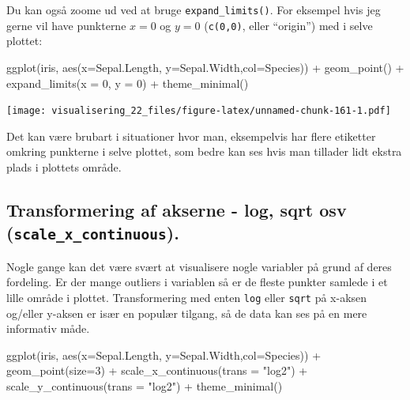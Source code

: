 \documentclass[
]{book}
\newenvironment{Shaded}{\begin{snugshade}}{\end{snugshade}}
\newcommand{\AttributeTok}[1]{\textcolor[rgb]{0.77,0.63,0.00}{#1}}
\newcommand{\DecValTok}[1]{\textcolor[rgb]{0.00,0.00,0.81}{#1}}
\newcommand{\FunctionTok}[1]{\textcolor[rgb]{0.00,0.00,0.00}{#1}}
\newcommand{\NormalTok}[1]{#1}
\newcommand{\SpecialCharTok}[1]{\textcolor[rgb]{0.00,0.00,0.00}{#1}}
\newcommand{\StringTok}[1]{\textcolor[rgb]{0.31,0.60,0.02}{#1}}
\begin{document}
Du kan også zoome ud ved at bruge \texttt{expand\_limits()}. For eksempel hvis jeg gerne vil have punkterne \(x = 0\) og \(y = 0\) (\texttt{c(0,0)}, eller ``origin'') med i selve plottet:

\begin{Shaded}
\begin{Highlighting}[]
\FunctionTok{ggplot}\NormalTok{(iris, }\FunctionTok{aes}\NormalTok{(}\AttributeTok{x=}\NormalTok{Sepal.Length, }\AttributeTok{y=}\NormalTok{Sepal.Width,}\AttributeTok{col=}\NormalTok{Species)) }\SpecialCharTok{+}
  \FunctionTok{geom\_point}\NormalTok{() }\SpecialCharTok{+} 
  \FunctionTok{expand\_limits}\NormalTok{(}\AttributeTok{x =} \DecValTok{0}\NormalTok{, }\AttributeTok{y =} \DecValTok{0}\NormalTok{) }\SpecialCharTok{+}
  \FunctionTok{theme\_minimal}\NormalTok{() }
\end{Highlighting}
\end{Shaded}

\texttt{[image: visualisering\_22\_files/figure-latex/unnamed-chunk-161-1.pdf]}

Det kan være brubart i situationer hvor man, eksempelvis har flere etiketter omkring punkterne i selve plottet, som bedre kan ses hvis man tillader lidt ekstra plads i plottets område.

\hypertarget{transformering-af-akserne---log-sqrt-osv-scale_x_continuous.}{%
\subsection{\texorpdfstring{Transformering af akserne - log, sqrt osv (\texttt{scale\_x\_continuous}).}{Transformering af akserne - log, sqrt osv (scale\_x\_continuous).}}\label{transformering-af-akserne---log-sqrt-osv-scale_x_continuous.}}

Nogle gange kan det være svært at visualisere nogle variabler på grund af deres fordeling. Er der mange outliers i variablen så er de fleste punkter samlede i et lille område i plottet. Transformering med enten \texttt{log} eller \texttt{sqrt} på x-aksen og/eller y-aksen er især en populær tilgang, så de data kan ses på en mere informativ måde.

\begin{Shaded}
\begin{Highlighting}[]
\FunctionTok{ggplot}\NormalTok{(iris, }\FunctionTok{aes}\NormalTok{(}\AttributeTok{x=}\NormalTok{Sepal.Length, }\AttributeTok{y=}\NormalTok{Sepal.Width,}\AttributeTok{col=}\NormalTok{Species)) }\SpecialCharTok{+}
  \FunctionTok{geom\_point}\NormalTok{(}\AttributeTok{size=}\DecValTok{3}\NormalTok{) }\SpecialCharTok{+} 
  \FunctionTok{scale\_x\_continuous}\NormalTok{(}\AttributeTok{trans =} \StringTok{"log2"}\NormalTok{) }\SpecialCharTok{+}
  \FunctionTok{scale\_y\_continuous}\NormalTok{(}\AttributeTok{trans =} \StringTok{"log2"}\NormalTok{) }\SpecialCharTok{+}
  \FunctionTok{theme\_minimal}\NormalTok{() }
\end{Highlighting}
\end{Shaded}
\end{document}
